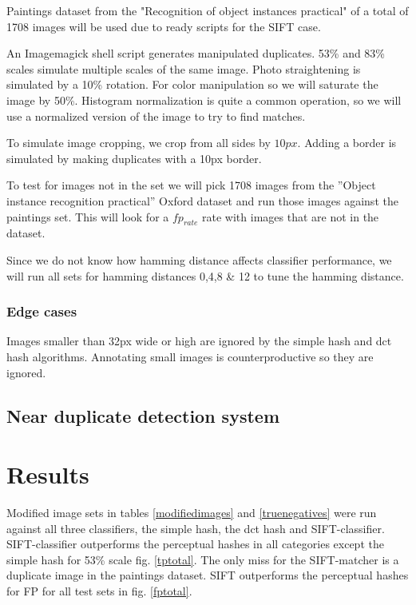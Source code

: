 \documentclass[english,12pt,a4paper,pdftex,elec,utf8]{aaltothesis}
\begin{document}
Paintings dataset from the "Recognition of object instances practical" \cite{Vedaldi2012} of a total of 1708 images will be used due to ready scripts for the SIFT case.

An Imagemagick shell script generates manipulated duplicates. 53\% and 83\% scales simulate multiple scales of the same image. Photo straightening is simulated by a 10\% rotation. For color manipulation so we will saturate the image by 50\%. Histogram normalization is quite a common operation, so we will use a normalized version of the image to try to find matches.

To simulate image cropping, we crop from all sides by $10px$. Adding a border is simulated by making duplicates with a 10px border.

To test for images not in the set we will pick 1708 images from the ''Object instance recognition practical'' Oxford dataset and run those images against the paintings set. This will look for a $fp_{rate}$ rate with images that are not in the dataset.

Since we do not know how hamming distance affects classifier performance, we will run all sets for hamming distances 0,4,8 \& 12 to tune the hamming distance.


\subsubsection{Edge cases}
Images smaller than 32px wide or high are ignored by the simple hash and dct hash algorithms. Annotating small images is counterproductive so they are ignored.


\subsection{Near duplicate detection system}

\clearpage

\section{Results}
Modified image sets in tables \ref{modifiedimages} and \ref{truenegatives} were run against all three classifiers, the simple hash, the dct hash and SIFT-classifier. SIFT-classifier outperforms the perceptual hashes in all categories except the simple hash for 53\% scale fig. \ref{tptotal}. The only miss for the SIFT-matcher is a duplicate image in the paintings dataset. SIFT outperforms the perceptual hashes for FP for all test sets in fig. \ref{fptotal}.
\end{document}
